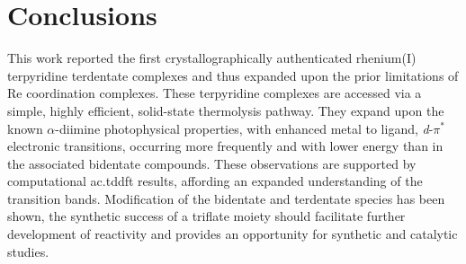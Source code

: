 \FloatBarrier
\section{Conclusions}

This work reported the first crystallographically authenticated rhenium(I) terpyridine terdentate complexes and thus expanded upon the prior limitations of Re coordination complexes. These terpyridine complexes are accessed via a simple, highly efficient, solid-state thermolysis pathway. They expand upon the known $\alpha$-diimine photophysical properties, with enhanced metal to ligand, \textit{d}-$\pi^\ast$ electronic transitions, occurring more frequently and with lower energy than in the associated bidentate compounds. These observations are supported by computational \gls{ac.tddft} results, affording an expanded understanding of the transition bands. Modification of the bidentate and terdentate species has been shown, the synthetic success of a triflate moiety should facilitate further development of reactivity and provides an opportunity for synthetic and catalytic studies.



